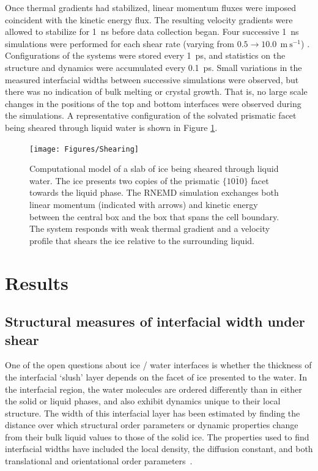Once thermal gradients had stabilized, linear momentum fluxes were
imposed coincident with the kinetic energy flux. The resulting
velocity gradients were allowed to stabilize for 1~ns before data
collection began. Four successive 1~ns simulations were performed for
each shear rate (varying from
$0.5 \rightarrow 10.0~\mathrm{~m~s}^{-1}$) . Configurations of the
systems were stored every 1~ps, and statistics on the structure and
dynamics were accumulated every 0.1~ps. Small variations in the
measured interfacial widths between successive simulations were
observed, but there was no indication of bulk melting or crystal
growth.  That is, no large scale changes in the positions of the top
and bottom interfaces were observed during the simulations.  A
representative configuration of the solvated prismatic facet being
sheared through liquid water is shown in Figure \ref{fig:Shearing}.

\begin{figure}
\texttt{[image: Figures/Shearing]}
\caption{\label{fig:Shearing} Computational model of a slab of ice
  being sheared through liquid water.  The ice presents two copies of
  the prismatic $\{10\bar{1}0\}$ facet towards the liquid phase.  The
  RNEMD simulation exchanges both linear momentum (indicated with
  arrows) and kinetic energy between the central box and the box that
  spans the cell boundary.  The system responds with weak thermal
  gradient and a velocity profile that shears the ice relative to the
  surrounding liquid.}
\end{figure}

\section{Results}

\subsection{Structural measures of interfacial width under shear}
One of the open questions about ice / water interfaces is whether the
thickness of the interfacial `slush' layer depends on the facet
of ice presented to the water. In the interfacial region, the water
molecules are ordered differently than in either the solid or liquid
phases, and also exhibit dynamics unique to their local structure.
The width of this interfacial layer has been estimated by finding the
distance over which structural order parameters or dynamic properties
change from their bulk liquid values to those of the solid ice. The
properties used to find interfacial widths have included the local
density, the diffusion constant, and both translational and
orientational order
parameters~\cite{Karim1988,Karim1990,Hayward2001,Hayward2002,Bryk2002,Gay2002,Louden2013}.

